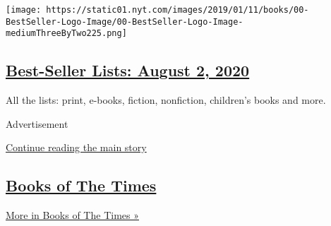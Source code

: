 \begin{enumerate}
  \texttt{[image: https://static01.nyt.com/images/2019/01/11/books/00-BestSeller-Logo-Image/00-BestSeller-Logo-Image-mediumThreeByTwo225.png]}

  \hypertarget{best-seller-lists-august-2-2020}{%
  \subsection{\texorpdfstring{\href{/interactive/2020/01/29/books/review/best-sellers-promo-for-front-copy2.html}{Best-Seller
  Lists: August 2,
  2020}}{Best-Seller Lists: August 2, 2020}}\label{best-seller-lists-august-2-2020}}

  All the lists: print, e-books, fiction, nonfiction, children's books
  and more.
\end{enumerate}

Advertisement

\protect\hyperlink{after-mid1}{Continue reading the main story}

\hypertarget{books-of-the-times-2}{%
\subsection{\texorpdfstring{\href{/column/books-of-the-times}{Books of
The Times}}{Books of The Times}}\label{books-of-the-times-2}}

\href{/column/books-of-the-times}{More in Books of The Times »}


